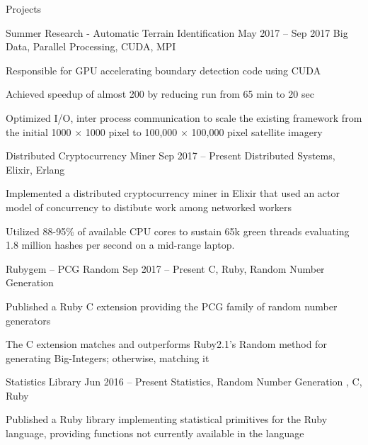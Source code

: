 \begin{rSection}{Projects}

%
%
\begin{rSubsection}
    {Summer Research - Automatic Terrain Identification}
    {May 2017 -- Sep 2017}
    {Big Data, Parallel Processing, CUDA, MPI}
    {}
    \item {Responsible for GPU accelerating boundary detection code using CUDA}
    \item {Achieved speedup of almost 200 by reducing run from 65 min to 20 sec}
    \item {Optimized I/O, inter process communication to scale the existing framework from the initial 1000 $\times$ 1000 pixel to 100,000 $\times$ 100,000 pixel satellite imagery}
\end{rSubsection}

%
%
\begin{rSubsection}
    {Distributed Cryptocurrency Miner}
    {Sep 2017 -- Present}
    {Distributed Systems, Elixir, Erlang}
    {}
    \item{Implemented a distributed cryptocurrency miner in Elixir that used an actor model of concurrency to distibute work among networked workers}
    \item{Utilized 88-95\% of available CPU cores to sustain 65k green threads evaluating 1.8 million hashes per second on a mid-range laptop.}
\end{rSubsection}

%
%
\begin{rSubsection}
    {Rubygem -- PCG Random}
    {Sep 2017 -- Present}
    {C, Ruby, Random Number Generation}
    {}
    \item{Published a Ruby C extension providing the PCG family of random number generators}
    \item{The C extension matches and outperforms Ruby2.1's Random method for generating Big-Integers; otherwise, matching it}
    \end{rSubsection}

%
%
\begin{rSubsection}
    {Statistics Library}
    {Jun 2016 -- Present}
    {Statistics, Random Number Generation , C, Ruby}
    {}
    \item{Published a Ruby library implementing statistical primitives for the Ruby language, providing functions not currently available in the language}
\end{rSubsection}


\end{rSection}
